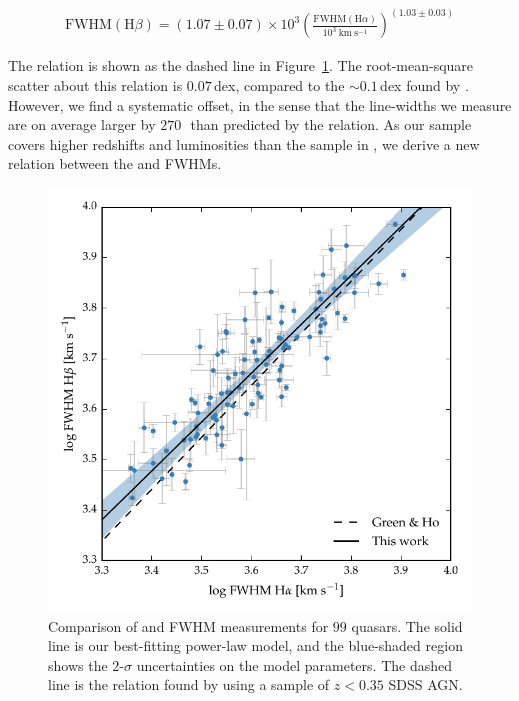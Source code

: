 \begingroup\makeatletter{}\check@mathfonts
\begin{eqnarray}
  \text{FWHM}(\text{H}\beta) = \left( 1.07 \pm 0.07 \right) \times 10^3 \left( \frac{ \text{FWHM}(\text{H}\alpha) }{10^3 ~\text{km}~\text{s}^{-1} } \right)^{(1.03 \pm 0.03)}
\end{eqnarray}
\endgroup

\noindent The relation is shown as the dashed line in Figure~\ref{fig:hahbcomp}.
The root-mean-square scatter about this relation is $0.07$\,dex, compared to the $\sim0.1$\,dex found by \citet{greene05b}. 
However, we find a systematic offset, in the sense that the \hb line-widths we measure are on average larger by $270$\,\kms\, than predicted by the \citet{greene05b} relation. 
As our sample covers higher redshifts and luminosities than the sample in \citet{greene05b}, we derive a new relation between the \ha and \hb FWHMs.       

\begin{figure}[h!]
    \centering 
    \includegraphics[width=0.8\columnwidth]{figures/chapter03/ha_hb_width_comparison.pdf} 
    \caption[{Comparison of \ha and \hb FWHM measurements for $99$ quasars.}]{Comparison of \ha and \hb FWHM measurements for $99$ quasars. The solid line is our best-fitting power-law model, and the blue-shaded region shows the $2$-$\sigma$ uncertainties on the model parameters. The dashed line is the relation found by \citet{greene05b} using a sample of $z<0.35$ SDSS AGN.} 
    \label{fig:hahbcomp}
\end{figure}

